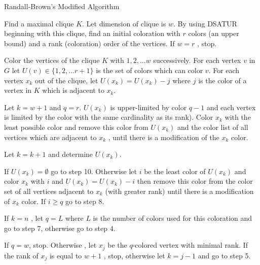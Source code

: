 \documentclass{beamer}
\begin{document}
\begin{frame}{Randall-Brown's Modified Algorithm}
\begin{enumerate}

{\tiny  \item Find a maximal clique $K$. Let dimension of clique is $w$. By using DSATUR
beginning with this clique, find an initial coloration with $r$ colors (an
upper bound) and a rank (coloration) order of the vertices. If $w = r$ , stop.\\
 
\item  Color the vertices of the clique $K$ with $1, 2, . . . w$ successively. For each
vertex $v$ in $G$ let $U(v) \in \{1, 2, . . . r + 1\}$ is the set of colors which can color
$v$. For each vertex $x_k$ out of the clique, let $U(x_k) = U(x_k) - j$ where $j$ is
the color of a vertex in $K$ which is adjacent to $x_k$.\\
 
\item  Let $k = w + 1$ and $q = r$.\newline
$U(x_k)$ is upper-limited by color $q - 1$ and each vertex is limited by the color
with the same cardinality as its rank). Color $x_k$ with the least possible
color and remove this color from $U(x_k)$ and the color list of all vertices
which are adjacent to $x_k$ , until there is a modification of the $x_k$ color.
 
\item Let $k = k + 1$ and determine $U(x_k)$.\\
 
\item  If $U(x_k) = \emptyset$ go to step 10. Otherwise let $i$ be the least color of $U(x_k)$ and
color $x_k$ with $i$ and $U(x_k) = U(x_k) - i$ then remove this color from the
color set of all vertices adjacent to $x_k$ (with greater rank) until there is a
modification of $x_k$ color. If $i \geq q$ go to step 8.\\
 
\item  If $k = n$ , let $q = L$ where $L$ is the number of colors used for this coloration
and go to step 7, otherwise go to step 4.\\
 
\item  If $q = w$, stop. Otherwise , let $x_j$ be the $q$-colored vertex with minimal
rank. If the rank of $x_j$ is equal to $w + 1$ , stop, otherwise let $k = j - 1$ and
go to step 5.\\
 
}
\end{enumerate}
\end{frame}
\end{document}
